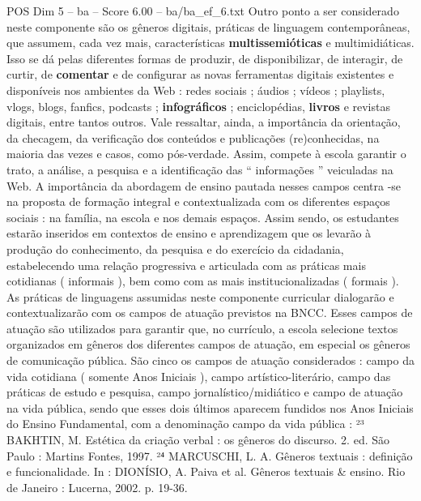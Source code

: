 \begin{textsample}{POS Dim 5 – ba – Score 6.00 – ba/ba\_ef\_6.txt}
Outro ponto a ser considerado neste componente são os gêneros digitais, práticas de linguagem contemporâneas, que assumem, cada vez mais, características \textbf{multissemióticas} e multimidiáticas.
Isso se dá pelas diferentes formas de produzir, de disponibilizar, de interagir, de curtir, de \textbf{comentar} e de configurar as novas ferramentas digitais existentes e disponíveis nos ambientes da Web : redes sociais ; áudios ; vídeos ; playlists, vlogs, blogs, fanfics, podcasts ; \textbf{infográficos} ; enciclopédias, \textbf{livros} e revistas digitais, entre tantos outros.
Vale ressaltar, ainda, a importância da orientação, da checagem, da verificação dos conteúdos e publicações (re)conhecidas, na maioria das vezes e casos, como pós-verdade.
Assim, compete à escola garantir o trato, a análise, a pesquisa e a identificação das “ informações ” veiculadas na Web.
A importância da abordagem de ensino pautada nesses campos centra -se na proposta de formação integral e contextualizada com os diferentes espaços sociais : na família, na escola e nos demais espaços.
Assim sendo, os estudantes estarão inseridos em contextos de ensino e aprendizagem que os levarão à produção do conhecimento, da pesquisa e do exercício da cidadania, estabelecendo uma relação progressiva e articulada com as práticas mais cotidianas ( informais ), bem como com as mais institucionalizadas ( formais ).
As práticas de linguagens assumidas neste componente curricular dialogarão e contextualizarão com os campos de atuação previstos na BNCC.
Esses campos de atuação são utilizados para garantir que, no currículo, a escola selecione textos organizados em gêneros dos diferentes campos de atuação, em especial os gêneros de comunicação pública.
São cinco os campos de atuação considerados : campo da vida cotidiana ( somente Anos Iniciais ), campo artístico-literário, campo das práticas de estudo e pesquisa, campo jornalístico/midiático e campo de atuação na vida pública, sendo que esses dois últimos aparecem fundidos nos Anos Iniciais do Ensino Fundamental, com a denominação campo da vida pública : ²³ BAKHTIN, M.
Estética da criação verbal : os gêneros do discurso. 2. ed.
São Paulo : Martins Fontes, 1997. ²⁴ MARCUSCHI, L.
A.
Gêneros textuais : definição e funcionalidade.
In : DIONÍSIO, A.
Paiva et al.
Gêneros textuais \& ensino.
Rio de Janeiro : Lucerna, 2002. p. 19-36.

\end{textsample}
